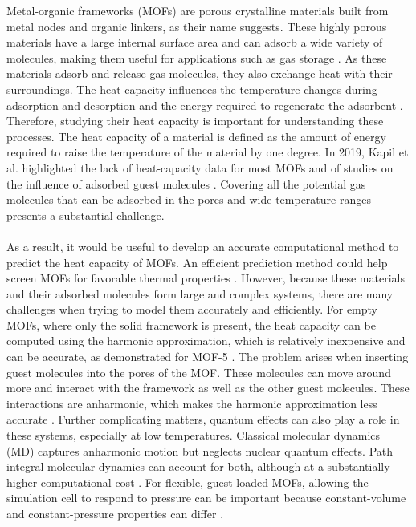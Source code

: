 \documentclass[12pt,a4paper]{article}
\numberwithin{equation}{section}
\begin{document}
Metal-organic frameworks (MOFs) are porous crystalline materials built
from metal nodes and organic linkers, as their name suggests.
These highly porous materials have a large internal surface area and can adsorb a wide variety of molecules,
making them useful for applications such as gas storage \cite{furukawa2013}.
As these materials adsorb and release gas molecules, they also exchange heat with their surroundings.
The heat capacity influences the temperature changes during adsorption and desorption and the energy required to regenerate the adsorbent \cite{kapil2019}.
Therefore, studying their heat capacity is important for understanding these processes.
The heat capacity of a material is defined as the amount of energy required to raise the temperature of the material by one degree.
In 2019, Kapil et al. highlighted the lack of heat-capacity data for most MOFs and of studies on the influence of adsorbed guest molecules \cite{kapil2019}.
Covering all the potential gas molecules that can be adsorbed in the pores and wide temperature ranges presents a substantial challenge.
\\
\\
As a result, it would be useful to develop an accurate computational method to predict the heat capacity of MOFs.
An efficient prediction method could help screen MOFs for favorable thermal properties \cite{kapil2019}.
However, because these materials and their adsorbed molecules form large and complex systems,
there are many challenges when trying to model them accurately and efficiently.
For empty MOFs, where only the solid framework is present, the heat capacity can be computed using the harmonic approximation,
which is relatively inexpensive and can be accurate, as demonstrated for MOF-5 \cite{kapil2019}.
The problem arises when inserting guest molecules into the pores of the MOF.
These molecules can move around more and interact with the framework as well as the other guest molecules.
These interactions are anharmonic, which makes the harmonic approximation less accurate \cite{kapil2019}.
Further complicating matters, quantum effects can also play a role in these systems, especially at low temperatures.
Classical molecular dynamics (MD) captures anharmonic motion but neglects nuclear quantum effects.
Path integral molecular dynamics can account for both, although at a substantially higher computational cost \cite{kapil2019}.
For flexible, guest-loaded MOFs, allowing the simulation cell to respond to pressure can be important because constant-volume and constant-pressure properties can differ \cite{kapil2019}.
\end{document}
